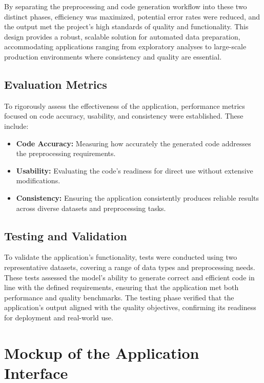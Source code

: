 By separating the preprocessing and code generation workflow into these two distinct phases, efficiency was maximized, potential error rates were reduced, and the output met the project's high standards of quality and functionality. This design provides a robust, scalable solution for automated data preparation, accommodating applications ranging from exploratory analyses to large-scale production environments where consistency and quality are essential.

\subsection{Evaluation Metrics}
To rigorously assess the effectiveness of the application, performance metrics focused on code accuracy, usability, and consistency were established. These include:
\begin{itemize}
    \item \textbf{Code Accuracy:} Measuring how accurately the generated code addresses the preprocessing requirements.
    \item \textbf{Usability:} Evaluating the code's readiness for direct use without extensive modifications.
    \item \textbf{Consistency:} Ensuring the application consistently produces reliable results across diverse datasets and preprocessing tasks.
\end{itemize}

\subsection{Testing and Validation}
To validate the application's functionality, tests were conducted using two representative datasets, covering a range of data types and preprocessing needs. These tests assessed the model's ability to generate correct and efficient code in line with the defined requirements, ensuring that the application met both performance and quality benchmarks. The testing phase verified that the application's output aligned with the quality objectives, confirming its readiness for deployment and real-world use.

\section{Mockup of the Application Interface}

